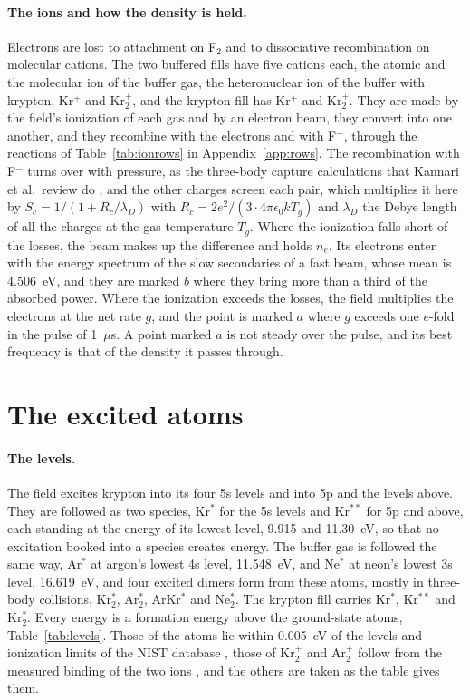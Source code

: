\documentclass[11pt]{article}
\begin{document}
\paragraph{The ions and how the density is held.}
Electrons are lost to attachment on F$_2$ and to dissociative recombination on molecular cations. The two buffered
fills have five cations each, the atomic and the molecular ion of the buffer gas, the heteronuclear ion of the
buffer with krypton, Kr$^+$ and Kr$_2^+$, and the krypton fill has Kr$^+$ and Kr$_2^+$. They are made by the
field's ionization of each gas and by an electron beam, they convert into one another, and they recombine with the
electrons and with F$^-$, through the reactions of Table~\ref{tab:ionrows} in Appendix~\ref{app:rows}. The
recombination with F$^-$ turns over with pressure, as the three-body capture calculations that Kannari et al.\
review do \cite{Kannari1985}, and the other charges screen each pair, which multiplies it here by
$S_c=1/(1+R_c/\lambda_D)$ with $R_c=2e^2/(3\cdot4\pi\epsilon_0kT_g)$ and $\lambda_D$ the Debye length of all the
charges at the gas temperature $T_g$. Where the ionization falls short of the losses, the beam makes up the
difference and holds $n_e$. Its electrons enter with the energy spectrum of the slow secondaries of a fast beam,
whose mean is 4.506~eV, and they are marked $b$ where they bring more than a third of the absorbed power. Where
the ionization exceeds the losses, the field multiplies the electrons at the net rate $g$, and the point is marked
$a$ where $g$ exceeds one $e$-fold in the pulse of 1~$\mu$s. A point marked $a$ is not steady over the pulse, and
its best frequency is that of the density it passes through.

\section{The excited atoms}
\label{sec:ladder}

\paragraph{The levels.}
The field excites krypton into its four 5s levels and into 5p and the levels above. They are followed as two
species, Kr$^*$ for the 5s levels and Kr$^{**}$ for 5p and above, each standing at the energy of its lowest level,
9.915 and 11.30~eV, so that no excitation booked into a species creates energy. The buffer gas is followed the same
way, Ar$^*$ at argon's lowest 4s level, 11.548~eV, and Ne$^*$ at neon's lowest 3s level, 16.619~eV, and four
excited dimers form from these atoms, mostly in three-body collisions, Kr$_2^*$, Ar$_2^*$, ArKr$^*$ and Ne$_2^*$.
The krypton fill carries Kr$^*$, Kr$^{**}$ and Kr$_2^*$. Every energy is a formation energy above the ground-state
atoms, Table~\ref{tab:levels}. Those of the atoms lie within 0.005~eV of the levels and ionization limits of the
NIST database \cite{NISTASD}, those of Kr$_2^+$ and Ar$_2^+$ follow from the measured binding of the two ions
\cite{Ng1977}, and the others are taken as the table gives them.
\end{document}
